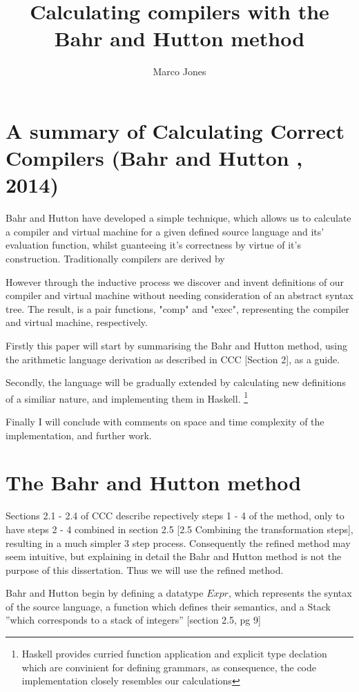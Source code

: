\documentclass {article}
\title{Calculating compilers with the Bahr and Hutton method}
\author{Marco Jones}
\date{}
\begin{document}
\maketitle

\newcommand{\BH}{Bahr and Hutton }

\section{A summary of Calculating Correct Compilers (\BH, 2014)}
\BH have developed a simple technique, which allows us to
calculate a compiler and virtual machine for a given defined source language and its' evaluation function, 
whilst guanteeing it's correctness by virtue of it's construction.\cite{bandh}
Traditionally compilers are derived by %

However through the inductive process we discover and invent definitions
of our compiler and virtual machine without needing consideration of an 
abstract syntax tree.
The result, is a pair functions,  "comp" and "exec",
representing the compiler and virtual machine, respectively.

Firstly this paper will start by summarising the \BH method,
using the arithmetic language derivation as described in
CCC [Section 2], as a guide. 

Secondly, the language will be gradually extended
by calculating new definitions of a similiar nature,
and implementing them in Haskell.
\footnote{Haskell provides curried function application
		and explicit type declation which are
		convinient for defining grammars,
		as consequence, the code implementation closely
		resembles our calculations}

Finally I will conclude with comments on space and time complexity
of the implementation, and further work.

\section{The Bahr and Hutton method}

Sections 2.1 - 2.4 of CCC describe repectively steps
1 - 4 of the method, only to have steps 2 - 4 combined
in section 2.5 \cite{bandh}[2.5 Combining the transformation steps],
resulting in a much simpler 3 step process.
Consequently the refined method may seem intuitive,
but explaining in detail the \BH method is not the purpose
of this dissertation. Thus we will use the refined method.

\BH begin by defining a datatype $Expr$, which represents
the syntax of the source language,
a function which defines their semantics,
and a Stack ''which corresponds to a stack of integers''
\cite{bandh}[section 2.5, pg 9]
\end{document}
